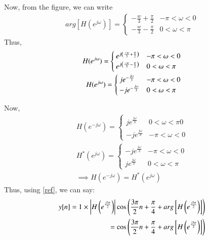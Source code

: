 \documentclass[journal,12pt,twocolumn]{IEEEtran}
\begin{document}
Now, from the figure, we can write
\begin{align}
    arg[H(e^{j\omega})] = \begin{cases}
    -\frac{w}{3} + \frac{\pi}{2} &  -\pi<\omega<0\\
    -\frac{w}{3} -\frac{\pi}{2} &  0<\omega<\pi
    \end{cases}
    \label{arg}
\end{align}
Thus,
\begin{align}
    H(e^{j\omega}) = 
    \begin{cases}
    e^{j\left(\frac{-w}{3} + \frac{\pi}{2}\right)} & -\pi < \omega < 0\\
    e^{j\left(\frac{-w}{3} - \frac{\pi}{2}\right)} & 0<\omega<\pi
    \end{cases}\\
    H(e^{j\omega}) = 
    \begin{cases}
    je^{-\frac{j\omega}{3}} & -\pi < \omega < 0\\
    -je^{-\frac{j\omega}{3}} & 0<\omega<\pi
    \end{cases}\\
    \label{transfer}
\end{align}

Now, 
\begin{align}
    H(e^{-j\omega}) = 
    \begin{cases}
    je^{\frac{j\omega}{3}} & 0<\omega<\pi0\\
    -je^{\frac{j\omega}{3}} & -\pi < \omega < 0
    \end{cases}\\
    H^*(e^{j\omega}) = 
    \begin{cases}
    -je^{\frac{j\omega}{3}} & -\pi < \omega < 0\\
    je^{\frac{j\omega}{3}} & 0<\omega<\pi
    \end{cases}\\
    \implies H(e^{-j\omega}) = H^*(e^{j\omega})
\end{align}
Thus, using \eqref{ref}, we can say:
\begin{align}
    y[n] = 1\times \left\vert H\left(e^{\frac{j3\pi}{2}}\right)\right\vert\cos\left(\frac{3\pi}{2}n + \frac{\pi}{4} + arg{}\left[H\left(e^{\frac{j3\pi}{2}}\right)\right]\right)\\
     = \cos\left(\frac{3\pi}{2}n + \frac{\pi}{4} + arg{}\left[H\left(e^{\frac{j3\pi}{2}}\right)\right]\right)
     \end{align}
\end{document}
